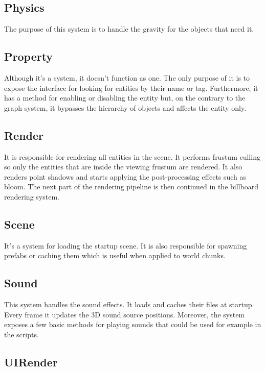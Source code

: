 \documentclass[12pt, english]{article}
\begin{document}
\subsection{Physics}

The purpose of this system is to handle the gravity for the objects that need it.

\subsection{Property}

Although it's a system, it doesn't function as one. The only purpose of it is
to expose the interface for looking for entities by their name or tag.
Furthermore, it has a method for enabling or disabling the entity but, on the
contrary to the graph system, it bypasses the hierarchy of objects and affects
the entity only.

\subsection{Render}

It is responsible for rendering all entities in the scene. It performs frustum
culling so only the entities that are inside the viewing frustum are rendered.
It also renders point shadows and starts applying the post-processing effects
such as bloom. The next part of the rendering pipeline is then continued in the
billboard rendering system.

\subsection{Scene}

It's a system for loading the startup scene. It is also responsible for
spawning prefabs or caching them which is useful when applied to world chunks.

\subsection{Sound}

This system handles the sound effects. It loads and caches their files at
startup. Every frame it updates the 3D sound source positions. Moreover, the
system exposes a few basic methods for playing sounds that could be used for
example in the scripts.

\subsection{UIRender}
\end{document}
